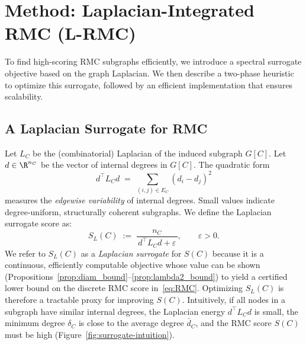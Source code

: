 \documentclass{article} %
\theoremstyle{remark}
\begin{document}

\section{Method: Laplacian-Integrated RMC (L-RMC)}
To find high-scoring RMC subgraphs efficiently, we introduce a spectral surrogate objective based on the graph Laplacian. We then describe a two-phase heuristic to optimize this surrogate, followed by an efficient implementation that ensures scalability.

\subsection{A Laplacian Surrogate for RMC}
Let \(L_C\) be the (combinatorial) Laplacian of the induced subgraph \(G[C]\). Let \(d\in\R^{n_C}\) be the vector of internal degrees in \(G[C]\). The quadratic form
\[
d^\top L_C d \;=\; \sum_{(i,j)\in E_C} (d_i - d_j)^2
\]
measures the \emph{edgewise variability} of internal degrees. Small values indicate degree-uniform, structurally coherent subgraphs. We define the Laplacian surrogate score as:
\begin{equation}
\label{eq:SL}
S_L(C) \;:=\; \frac{n_C}{\,d^\top L_C d + \varepsilon\,}, \qquad \varepsilon>0.
\end{equation}
We refer to $S_L(C)$ as a \emph{Laplacian surrogate} for $S(C)$ because it is a
continuous, efficiently computable objective whose value can be shown
(Propositions~\ref{prop:diam_bound}--\ref{prop:lambda2_bound}) to yield a certified
lower bound on the discrete RMC score in~\eqref{eq:RMC}.
Optimizing $S_L(C)$ is therefore a tractable proxy for improving $S(C)$.
Intuitively, if all nodes in a subgraph have similar internal degrees, the Laplacian energy $d^\top L_C d$ is small, the minimum degree $\delta_C$ is close to the average degree $\bar d_C$, and the RMC score $S(C)$ must be high (Figure~\ref{fig:surrogate-intuition}).

\end{document}

